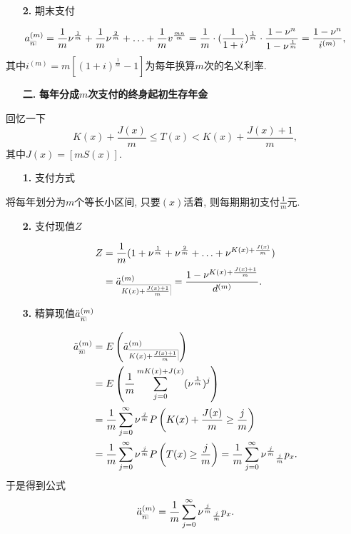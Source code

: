 \documentclass[a4paper,openany, 10pt]{ctexbook}
\makeatletter
\newcommand{\hei}{\CJKfamily{hei}}      %
\def\z{\left}
\def\y{\right}
\DeclareRobustCommand{\annu}[1]{_{%
    \def\arraystretch{0}%
    \setlength\arraycolsep{1pt}%
    \setlength\arrayrulewidth{.2pt}%
    \begin{array}[b]{@{}c|}\hline
        \\[\arraycolsep]%
        \scriptstyle #1%
    \end{array}%
}}
\makeatother
\begin{document}
\begin{itemize}
    \item[{\bf\hei 2.}] 期末支付
\end{itemize}
\begin{align*}
    a_{\annu{n}}^{(m)} = \frac1m \nu^{\frac1m} + \frac1m \nu^{\frac2m} + \ldots + \frac1mv^{\frac{mn}m} = \frac1m \cdot (\frac{1}{1+i})^{\frac1m} \cdot \frac{1-\nu^n}{1-\nu^{\frac1m}} = \frac{1-\nu^n}{i^{(m)}},
\end{align*}
其中$i^{(m)} = m[(1+i)^{\frac1m}-1]$为每年换算$m$次的名义利率.

\begin{itemize}
    \item[{\bf\hei 二.}]{\bf\hei 每年分成$m$次支付的终身起初生存年金}
\end{itemize}
回忆一下
$$ K(x) + \frac{J(x)}{m} \leq T(x) < K(x) + \frac{J(x)+1}{m},$$
其中$J(x) = [mS(x)].$
\begin{itemize}
    \item[{\bf\hei 1.}] 支付方式
\end{itemize}

将每年划分为$m$个等长小区间, 只要$(x)$活着, 则每期期初支付$\frac1m$元.

\begin{itemize}
    \item[{\bf\hei 2.}] 支付现值$Z$
\end{itemize}
\begin{align*}
  Z &= \frac1m(1+\nu^{\frac1m} + \nu^{\frac2m} + \ldots + \nu^{K(x)+\frac{J(x)}{m}}) \\
  &= \ddot a_{\annu{K(x)+\frac{J(x)+1}{m}}}^{(m)}= \frac{1-\nu^{K(x)+\frac{J(x)+1}{m}}}{d^{(m)}}.
\end{align*}
\begin{itemize}
    \item[{\bf\hei 3.}] 精算现值$\ddot{a}_{\annu{n}}^{(m)}$
\end{itemize}
\begin{align*}
    \ddot{a}_{\annu{n}}^{(m)} & = E\z(\ddot a_{\annu{K(x)+\frac{J(x)+1}{m}}}^{(m)}\y)                                                                             \\
                              & = E\z(\frac1m \sum_{j=0}^{mK(x)+J(x)} (\nu^\frac{1}m)^j\y)                                                                          \\
                              & = \frac1m \sum_{j=0}^{\infty} \nu^\frac{j}m P\z(K(x)+\frac{J(x)}m \geq \frac{j}{m}\y)                                               \\
                              & = \frac1m \sum_{j=0}^{\infty} \nu^\frac{j}m P\z(T(x)\geq \frac{j}{m}\y) = \frac1m \sum_{j=0}^{\infty} \nu^\frac{j}m {}_{\frac{j}m}p_x.
\end{align*}
于是得到公式
$$\ddot{a}_{\annu{n}}^{(m)}=\frac1m \sum_{j=0}^{\infty} \nu^\frac{j}m {}_{\frac{j}m}p_x.$$
\end{document}

